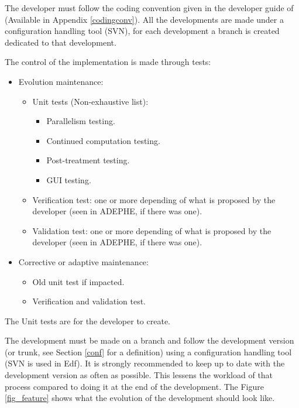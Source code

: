 The developer must follow the coding convention given in the developer guide of
\telemacsystem (Available in Appendix \ref{codingconv}). All the developments are made
under a configuration handling tool (SVN), for each development a branch is
created dedicated to that development.

The control of the implementation is made through tests:
\begin{itemize}
\item Evolution maintenance:
\begin{itemize}
\item Unit tests (Non-exhaustive list):
\begin{itemize}
\item Parallelism testing.
\item Continued computation testing.
\item Post-treatment testing.
\item GUI testing.
\end{itemize}
\item Verification test: one or more depending of what is proposed by the
developer (seen in ADEPHE, if there was one).
\item Validation test: one or more depending of what is proposed by the
developer (seen in ADEPHE, if there was one).
\end{itemize}
\item Corrective or adaptive maintenance:
\begin{itemize}
\item Old unit test if impacted.
\item Verification and validation test.
\end{itemize}
\end{itemize}

The Unit tests are for the developer to create.

The development must be made on a branch and follow the development version
(or trunk, see Section \ref{conf} for a definition) using a configuration
handling tool (SVN is used in Edf). It is strongly recommended to keep up to
date with the development version as often as possible. This lessens the
workload of that process compared to doing it at the end of the development.
The Figure \ref{fig_feature} shows what the evolution of the development should
look like.

